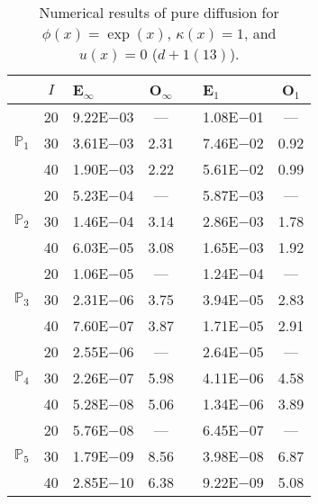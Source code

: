 \begin{table}[H]
\centering
\caption{Numerical results of pure diffusion for $\phi(x)=\exp(x)$, $\kappa(x)=1$, and $u(x)=0$ ($d+1 (13)$).}
\begin{tabular}{@{}l c l c c l c@{}}
\toprule
 & $I$ & E$_{\infty}$ & O$_{\infty}$ && E$_1$ & O$_1$\\
\midrule
\multirow{3}{*}{$\mathbb{P}_{1}$}
 & 20 & 9.22E$-$03 & --- && 1.08E$-$01 & ---\\
 & 30 & 3.61E$-$03 & 2.31 && 7.46E$-$02 & 0.92\\
 & 40 & 1.90E$-$03 & 2.22 && 5.61E$-$02 & 0.99\\
\midrule
\multirow{3}{*}{$\mathbb{P}_{2}$}
 & 20 & 5.23E$-$04 & --- && 5.87E$-$03 & ---\\
 & 30 & 1.46E$-$04 & 3.14 && 2.86E$-$03 & 1.78\\
 & 40 & 6.03E$-$05 & 3.08 && 1.65E$-$03 & 1.92\\
\midrule
\multirow{3}{*}{$\mathbb{P}_{3}$}
 & 20 & 1.06E$-$05 & --- && 1.24E$-$04 & ---\\
 & 30 & 2.31E$-$06 & 3.75 && 3.94E$-$05 & 2.83\\
 & 40 & 7.60E$-$07 & 3.87 && 1.71E$-$05 & 2.91\\
\midrule
\multirow{3}{*}{$\mathbb{P}_{4}$}
 & 20 & 2.55E$-$06 & --- && 2.64E$-$05 & ---\\
 & 30 & 2.26E$-$07 & 5.98 && 4.11E$-$06 & 4.58\\
 & 40 & 5.28E$-$08 & 5.06 && 1.34E$-$06 & 3.89\\
\midrule
\multirow{3}{*}{$\mathbb{P}_{5}$}
 & 20 & 5.76E$-$08 & --- && 6.45E$-$07 & ---\\
 & 30 & 1.79E$-$09 & 8.56 && 3.98E$-$08 & 6.87\\
 & 40 & 2.85E$-$10 & 6.38 && 9.22E$-$09 & 5.08\\
\bottomrule
\end{tabular}
\end{table}